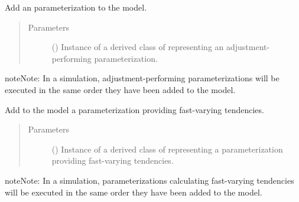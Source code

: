 \documentclass[letterpaper,10pt,english]{sphinxmanual}
\begin{document}
\begin{fulllineitems}
\begin{fulllineitems}
\label{\detokenize{api:tasmania.model.Model.add_adjustment_parameterization}}
Add an  parameterization to the model.
\begin{quote}\begin{description}
\item[{Parameters}] \leavevmode
{} () \textendash{} Instance of a derived class of {\hyperref[\detokenize{api:tasmania.parameterizations.adjustments.Adjustment}]{}}
representing an adjustment-performing parameterization.

\end{description}\end{quote}

\begin{sphinxadmonition}{note}{Note:}
In a simulation, adjustment-performing parameterizations will be executed in the same order
they have been added to the model.
\end{sphinxadmonition}

\end{fulllineitems}


\begin{fulllineitems}
\label{\detokenize{api:tasmania.model.Model.add_fast_tendency_parameterization}}
Add to the model a parameterization providing fast-varying tendencies.
\begin{quote}\begin{description}
\item[{Parameters}] \leavevmode
{} () \textendash{} Instance of a derived class of {\hyperref[\detokenize{api:tasmania.parameterizations.fast_tendencies.FastTendency}]{}}
representing a parameterization providing fast-varying tendencies.

\end{description}\end{quote}

\begin{sphinxadmonition}{note}{Note:}
In a simulation, parameterizations calculating fast-varying tendencies will be executed in the same
order they have been added to the model.
\end{sphinxadmonition}


\end{fulllineitems}
\end{fulllineitems}
\end{document}
